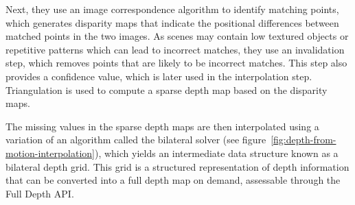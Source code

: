 Next, they use an image correspondence algorithm to identify matching points,
which generates disparity maps that indicate the positional differences between matched points in the two images.
As scenes may contain low textured objects or repetitive patterns which can lead to incorrect matches,
they use an invalidation step, which removes points that are likely to be incorrect matches.
This step also provides a confidence value, which is later used in the interpolation step.
Triangulation is used to compute a sparse depth map based on the disparity maps.

The missing values in the sparse depth maps are then interpolated using a variation of an algorithm called the bilateral solver (see figure~\ref{fig:depth-from-motion-interpolation}),
which yields an intermediate data structure known as a bilateral depth grid.
This grid is a structured representation of depth information that can be converted into a full depth map on demand,
assessable through the Full Depth API\@.

